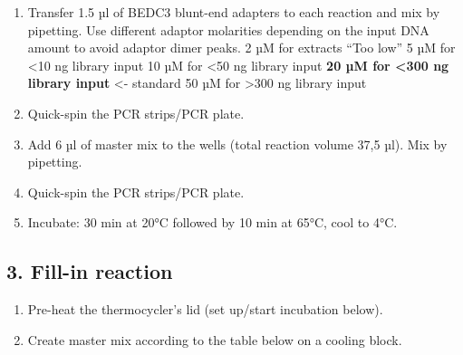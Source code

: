 \documentclass[
]{book}
\providecommand{\tightlist}{%
  \setlength{\itemsep}{0pt}\setlength{\parskip}{0pt}}
\begin{document}
\begin{enumerate}
\def\labelenumi{\arabic{enumi}.}
\setcounter{enumi}{2}
\item
  Transfer 1.5 µl of BEDC3 blunt-end adapters to each reaction and mix by pipetting. Use different adaptor molarities depending on the input DNA amount to avoid adaptor dimer peaks.
  2 µM for extracts ``Too low''
  5 µM for \textless10 ng library input
  10 µM for \textless50 ng library input
  \textbf{20 µM for \textless300 ng library input} \textless- standard
  50 µM for \textgreater300 ng library input
\item
  Quick-spin the PCR strips/PCR plate.
\item
  Add 6 µl of master mix to the wells (total reaction volume 37,5 µl). Mix by pipetting.
\item
  Quick-spin the PCR strips/PCR plate.
\item
  Incubate: 30 min at 20°C followed by 10 min at 65°C, cool to 4°C.
\end{enumerate}

\hypertarget{fill-in-reaction}{%
\subsection*{3. Fill-in reaction}\label{fill-in-reaction}}

\begin{enumerate}
\def\labelenumi{\arabic{enumi}.}
\tightlist
\item
  Pre-heat the thermocycler's lid (set up/start incubation below).
\item
  Create master mix according to the table below on a cooling block.
\end{enumerate}
\end{document}
